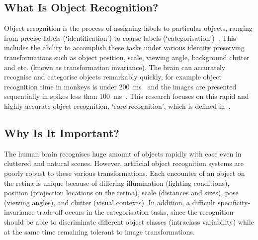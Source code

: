 \documentclass[journal]{journal}
\begin{document}
\subsection{What Is Object Recognition?}
\label{sec:aim}
Object recognition is the process of assigning labels to particular objects, ranging from precise labels (`identification') to coarse labels (`categorisation')~\cite{dicarlo2012does}.
This includes the ability to accomplish these tasks under various identity preserving transformations such as object position, scale, viewing angle, background clutter and etc. (known as transformation invariance).
The brain can accurately recognise and categorise objects remarkably quickly, for example object recognition time in monkeys is under 200~ms~\cite{fabre1998rapid} and the images are presented sequentially in spikes less than 100~ms~\cite{keysers2001speed}.
This research focuses on this rapid and highly accurate object recognition, `core recognition', which is defined in~\cite{dicarlo2007untangling}.


\subsection{Why Is It Important?}
\label{sec:imp}
The human brain recognises huge amount of objects rapidly with ease even in cluttered and natural scenes.
However, artificial object recognition systems are poorly robust to these various transformations.
Each encounter of an object on the retina is unique because of differing illumination (lighting conditions), position (projection locations on the retina), scale (distances and sizes), pose (viewing angles), and clutter (visual contexts).
In addition, a difficult specificity-invariance trade-off occurs in the categorisation tasks, since the recognition should be able to discriminate different object classes (intraclass variability) while at the same time remaining tolerant to image transformations.   
\end{document}
